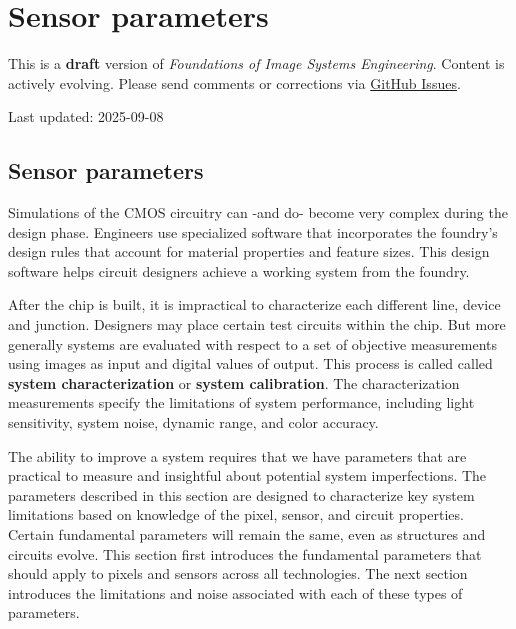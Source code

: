 \documentclass[
  letterpaper,
]{book}
\begin{document}
\chapter{Sensor parameters}\label{sec-system-parameters}

\begin{tcolorbox}[enhanced jigsaw, colframe=quarto-callout-warning-color-frame, titlerule=0mm, rightrule=.15mm, opacitybacktitle=0.6, colback=white, leftrule=.75mm, coltitle=black, title=\textcolor{quarto-callout-warning-color}{\faExclamationTriangle}\hspace{0.5em}{Work in Progress}, bottomrule=.15mm, colbacktitle=quarto-callout-warning-color!10!white, breakable, left=2mm, bottomtitle=1mm, toptitle=1mm, opacityback=0, arc=.35mm, toprule=.15mm]

This is a \textbf{draft} version of \emph{Foundations of Image Systems
Engineering}. Content is actively evolving. Please send comments or
corrections via \href{https://github.com/wandell/FISE-git/issues}{GitHub
Issues}.

Last updated: 2025-09-08

\end{tcolorbox}

\section{Sensor parameters}\label{sec-system-parameters-overview}

Simulations of the CMOS circuitry can -and do- become very complex
during the design phase. Engineers use specialized software that
incorporates the foundry's design rules that account for material
properties and feature sizes. This design software helps circuit
designers achieve a working system from the foundry.

After the chip is built, it is impractical to characterize each
different line, device and junction. Designers may place certain test
circuits within the chip. But more generally systems are evaluated with
respect to a set of objective measurements using images as input and
digital values of output. This process is called called \textbf{system
characterization} or \textbf{system calibration}. The characterization
measurements specify the limitations of system performance, including
light sensitivity, system noise, dynamic range, and color accuracy.

The ability to improve a system requires that we have parameters that
are practical to measure and insightful about potential system
imperfections. The parameters described in this section are designed to
characterize key system limitations based on knowledge of the pixel,
sensor, and circuit properties. Certain fundamental parameters will
remain the same, even as structures and circuits evolve. This section
first introduces the fundamental parameters that should apply to pixels
and sensors across all technologies. The next section introduces the
limitations and noise associated with each of these types of parameters.
\end{document}
